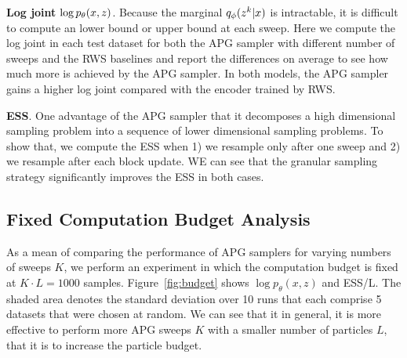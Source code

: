 \documentclass{article}
\theoremstyle{definition}
\begin{document}
\textbf{Log joint} $\log p_\theta(x, z)$. Because the marginal $q_\phi(z^k | x)$ is intractable, it is difficult to compute an lower bound or upper bound at each sweep. Here we compute the log joint in each test dataset for both the APG sampler with different number of sweeps and the RWS baselines and report the differences on average to see how much more is achieved by the APG sampler. In both models, the APG sampler gains a higher log joint compared with the encoder trained by RWS.

\textbf{ESS}. One advantage of the APG sampler that it decomposes a high dimensional sampling problem into a sequence of lower dimensional sampling problems. To show that, we compute the ESS when 1) we resample only after one sweep and 2) we resample after each block update. WE can see that the granular sampling strategy significantly improves the ESS in both cases.

\subsection{Fixed Computation Budget Analysis}
As a mean of comparing the performance of APG samplers for varying numbers of sweeps $K$, we perform an experiment in which the computation budget is fixed at $K \cdot L = 1000$ samples. Figure~\ref{fig:budget} shows $\log p_\theta(x, z)$ and ESS/L. The shaded area denotes the standard deviation over 10 runs that each comprise 5 datasets that were chosen at random. We can see that it in general, it is more effective to perform more APG sweeps $K$ with a smaller number of particles $L$, that it is to increase the particle budget. 
\end{document}
